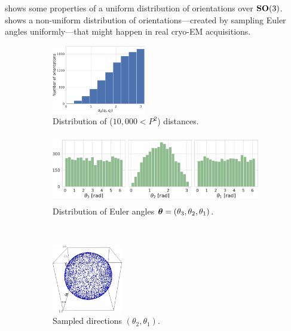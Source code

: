  shows some properties of a uniform distribution of orientations over $\mathrm{\mathbf{SO}}(3)$.
 shows a non-uniform distribution of orientations---created by sampling Euler angles uniformly---that might happen in real cryo-EM acquisitions.

\begin{figure}[ht!]
    \centering
    \begin{subfigure}[b]{0.30\linewidth}
        \centering
        \includegraphics[height=8em]{figures/dQ_5j0n_uniform_quaternions.pdf}
        \caption{Distribution of ($10,000<P^2$) distances.}
    \end{subfigure}
    \hfill
    \begin{subfigure}[b]{0.66\linewidth}
        \centering
        \includegraphics[height=8em]{figures/uniform_quaternions_ang.pdf}
        \caption{Distribution of Euler angles ${\boldsymbol{\theta}} = (\theta_3,\theta_2,\theta_1)$.}
    \end{subfigure}
    \\ \vspace{1em}
    \begin{subfigure}[b]{0.30\linewidth}
        \centering
        \includegraphics[height=8em]{figures/uniform_quaternion.png}
        \caption{Sampled directions $(\theta_2, \theta_1)$.}
    \end{subfigure}
    \hfill
    \begin{subfigure}[b]{0.66\linewidth}

\end{subfigure}
\end{figure}
